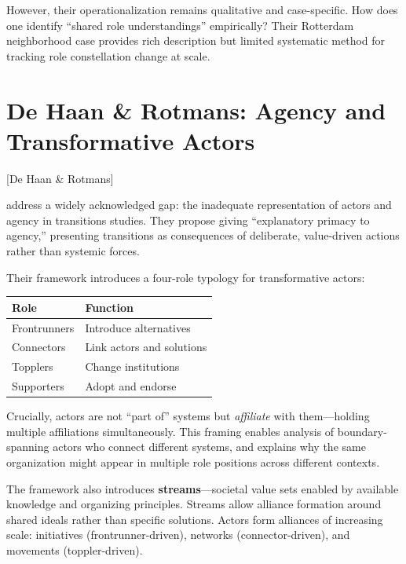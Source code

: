 \documentclass[../main.tex]{subfiles}
\begin{document}
However, their operationalization remains qualitative and case-specific. How does one identify ``shared role understandings'' empirically? Their Rotterdam neighborhood case provides rich description but limited systematic method for tracking role constellation change at scale.


\section{De Haan \& Rotmans: Agency and Transformative Actors}[De Haan \& Rotmans]

\textcite{dehaan2018power} address a widely acknowledged gap: the inadequate representation of actors and agency in transitions studies. They propose giving ``explanatory primacy to agency,'' presenting transitions as consequences of deliberate, value-driven actions rather than systemic forces.

Their framework introduces a four-role typology for transformative actors:

\begin{margintable}
\centering
\caption{Agency types and transition roles}
\label{tab:background:agency-roles}
\scriptsize
\begin{tabular}{@{}p{1.8cm}p{2.2cm}@{}}
\toprule
\textbf{Role} & \textbf{Function} \\
\midrule
Frontrunners & Introduce alternatives \\
Connectors & Link actors and solutions \\
Topplers & Change institutions \\
Supporters & Adopt and endorse \\
\bottomrule
\end{tabular}
\end{margintable}

Crucially, actors are not ``part of'' systems but \textit{affiliate} with them---holding multiple affiliations simultaneously. This framing enables analysis of boundary-spanning actors who connect different systems, and explains why the same organization might appear in multiple role positions across different contexts.

The framework also introduces \textbf{streams}---societal value sets enabled by available knowledge and organizing principles. Streams allow alliance formation around shared ideals rather than specific solutions. Actors form alliances of increasing scale: initiatives (frontrunner-driven), networks (connector-driven), and movements (toppler-driven).
\end{document}
